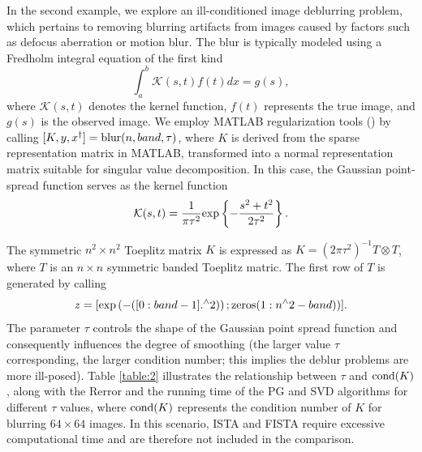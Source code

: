 \documentclass[a4paper,12pt]{article}
\numberwithin{equation}{section}
\begin{document}
In the second example, we explore an ill-conditioned image deblurring problem, which pertains to removing blurring artifacts from images caused by factors such as defocus aberration or motion blur. The blur is typically modeled using a Fredholm integral equation of the first kind
\begin{equation*}
   \int_{a}^{b}\mathcal{K}(s,t)f(t)dx=g(s),
\end{equation*}
where $\mathcal{K}(s,t)$ denotes the kernel function, $f(t)$ represents the true image, and $g(s)$ is the observed image. We employ MATLAB regularization tools (\cite{H07}) by calling $[K,y,x^{\dag}]={\rm blur}(n,band,\tau)$, where $K$ is derived from the sparse representation matrix in MATLAB, transformed into a normal representation matrix suitable for singular value decomposition. In this case, the Gaussian point-spread function serves as the kernel function
\begin{equation*}
   \mathcal{K}(s,t)=\frac{1}{\pi\tau^{2}}{\rm exp}\left\{-\frac{s^{2}+t^{2}}{2\tau^{2}}\right\}.
\end{equation*}

\par The symmetric $n^{2}\times n^{2}$ Toeplitz matrix $K$ is expressed as $K=(2\pi\tau^{2})^{-1}T\otimes T$, where $T$ is an $n\times n$ symmetric banded Toeplitz matric. The first row of $T$ is generated by calling
\begin{equation*}
    z=[{\rm exp}\left(-([0:band-1].^{\wedge} 2)\right);{\rm zeros}(1:n^{\wedge} 2-band))].
\end{equation*} 
The parameter $\tau$ controls the shape of the Gaussian point spread function and consequently influences the degree of smoothing (the larger value $\tau$ corresponding, the larger condition number; this implies the deblur problems are more ill-posed). Table \ref{table:2} illustrates the relationship between $\tau$ and ${\rm cond}(K)$, along with the Rerror and the running time of the PG and SVD algorithms for different $\tau$ values, where ${\rm cond}(K)$ represents the condition number of $K$ for blurring $64\times64$ images. In this scenario, ISTA and FISTA require excessive computational time and are therefore not included in the comparison.
\end{document}
